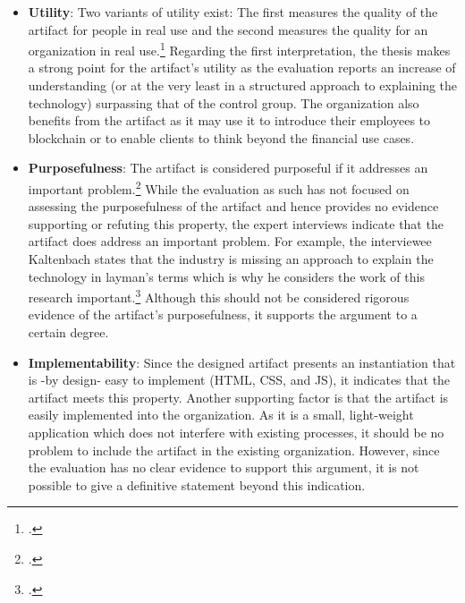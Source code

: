 \begin{itemize}
    \item \textbf{Utility}: Two variants of utility exist: The first measures the quality of the artifact for people in real use and the second measures the quality for an organization in real use.\footcites[Cf.][p.13]{HevnerDesignResearchInformation2010} Regarding the first interpretation, the thesis makes a strong point for the artifact's utility as the evaluation reports an increase of understanding (or at the very least in a structured approach to explaining the technology) surpassing that of the control group. The organization also benefits from the artifact as it may use it to introduce their employees to blockchain or to enable clients to think beyond the financial use cases.
    \item \textbf{Purposefulness}: The artifact is considered purposeful if it addresses an important problem.\footcites[Cf.][p.82]{HevnerDesignScienceResearch2004} While the evaluation as such has not focused on assessing the purposefulness of the artifact and hence provides no evidence supporting or refuting this property, the expert interviews indicate that the artifact does address an important problem. For example, the interviewee Kaltenbach states that the industry is missing an approach to explain the technology in layman's terms which is why he considers the work of this research important.\footcites[Cf.][]{DanielKaltenbach_Interview} Although this should not be considered rigorous evidence of the artifact's purposefulness, it supports the argument to a certain degree.
    \item \textbf{Implementability}: Since the designed artifact presents an instantiation that is -by design- easy to implement (\ac{HTML}, \ac{CSS}, and \ac{JS}), it indicates that the artifact meets this property. Another supporting factor is that the artifact is easily implemented into the organization. As it is a small, light-weight application which does not interfere with existing processes, it should be no problem to include the artifact in the existing organization. However, since the evaluation has no clear evidence to support this argument, it is not possible to give a definitive statement beyond this indication.
\end{itemize}

